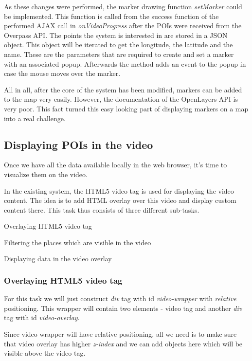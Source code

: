 \documentclass[journal]{IEEEtran}
\begin{document}
As these changes were performed, the marker drawing function \textit{setMarker} could be implemented. This function is called from the success function of the performed AJAX call in \textit{onVideoProgress} after the POIs were received from the Overpass API. The points the system is interested in are stored in a JSON object. This object will be iterated to get the longitude, the latitude and the name. These are the parameters that are required to create and set a marker with an associated popup. Afterwards the method adds an event to the popup in case the mouse moves over the marker.

All in all, after the core of the system has been modified, markers can be added to the map very easily. However, the documentation of the OpenLayers API is very poor. This fact turned this easy looking part of displaying markers on a map into a real challenge.


\subsection{Displaying POIs in the video}

Once we have all the data available locally in the web browser, it's time to visualize them on the video. 

In the existing system, the HTML5 video tag is used for displaying the video content. The idea is to add HTML overlay over this video and display custom content there. This task thus consists of three different sub-tasks.

	\begin{list}{\textbullet}{}
		\item Overlaying HTML5 video tag
		\item Filtering the places which are visible in the video
		\item Displaying data in the video overlay
	\end{list}

\subsubsection{Overlaying HTML5 video tag}

For this task we will just construct \textit{div} tag with id \textit{video-wrapper} with \textit{relative} positioning. This wrapper will contain two elements - video tag and another \textit{div} tag with id \textit{video-overlay}.

Since video wrapper will have relative positioning, all we need is to make sure that video overlay has higher \textit{z-index} and we can add objects here which will be visible above the video tag.
\end{document}
